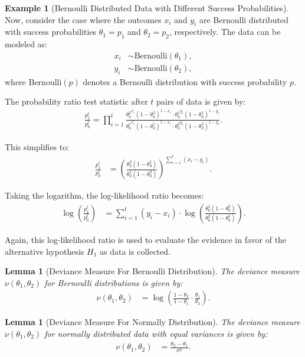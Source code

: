 \documentclass[magisterska, english]{pwr_wmat_praca_dyplomowa}
\theoremstyle{plain}
\numberwithin{theorem}{chapter}
\newtheorem{lemma}[theorem]{Lemma}
\theoremstyle{definition}
\numberwithin{theorem}{chapter}
\newtheorem{example}[theorem]{Example}
\begin{document}
\begin{example}[Bernoulli Distributed Data with Different Success Probabilities]
	Now, consider the case where the outcomes \(x_i\) and \(y_i\) are Bernoulli distributed with success probabilities \(\theta_1 = p_1\) and \(\theta_2 = p_2\), respectively. The data can be modeled as:
	\begin{align*}
		x_i &\sim \text{Bernoulli}(\theta_1), \\
		y_i &\sim \text{Bernoulli}(\theta_2),
	\end{align*}
	where \(\text{Bernoulli}(p)\) denotes a Bernoulli distribution with success probability \(p\).
	
	The probability ratio test statistic after \(t\) pairs of data is given by:
	\begin{align*}
		\frac{p_1^t}{p_0^t} = \prod_{i=1}^{t} \frac{{\theta_0^2}^{x_i}(1-\theta_0^2)^{1-x_i} \cdot {\theta_0^1}^{y_i}(1-\theta_0^1)^{1-y_i}}{{\theta_0^1}^{x_i}(1-\theta_0^1)^{1-x_i} \cdot {\theta_0^2}^{y_i}(1-\theta_0^2)^{1-y_i}}.
	\end{align*}
	
	This simplifies to:
	\begin{align*}
		\frac{p_1^t}{p_0^t} &= \left(\frac{\theta_0^2(1-\theta_0^1)}{\theta_0^1(1-\theta_0^2)}\right)^{\sum_{i=1}^{t} (x_i - y_i)}.
	\end{align*}
	
	Taking the logarithm, the log-likelihood ratio becomes:
	\begin{align*}
		\log \left(\frac{p_1^t}{p_0^t}\right) &= \sum_{i=1}^{t} (y_i - x_i) \cdot \log \left(\frac{\theta_0^1(1-\theta_0^2)}{\theta_0^2(1-\theta_0^1)}\right).
	\end{align*}
	
	Again, this log-likelihood ratio is used to evaluate the evidence in favor of the alternative hypothesis \(H_1\) as data is collected.
\end{example}

\begin{lemma}[Deviance Measure For Bernoulli Distribution]
	The deviance measure \(\nu(\theta_1, \theta_2)\) for Bernoulli distributions is given by:
	\begin{align*}
		\nu(\theta_1, \theta_2) &= \log \left(\frac{1 - \theta_2}{1 - \theta_1} \cdot \frac{\theta_1}{\theta_2}\right).
	\end{align*}
\end{lemma}

\begin{lemma}[Deviance Measure For Normally Distribution]
	The deviance measure \(\nu(\theta_1, \theta_2)\) for normally distributed data with equal variances is given by:
	\begin{align*}
		\nu(\theta_1, \theta_2) &= \frac{\theta_2 - \theta_1}{\sigma^2}.
	\end{align*}
\end{lemma}
\end{document}

